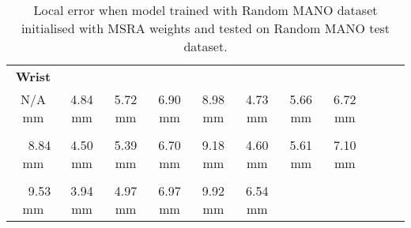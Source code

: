     \begin{table}[!ht]
    \begin{tabular}{|c|c|c|c|c|c|c|c|c|c|c|}
    \hline
    {\bfseries Wrist} & \cellcolor[HTML]{00ff00}{\bfseries IMCP} & \cellcolor[HTML]{00ff00}{\bfseries IPIP} & \cellcolor[HTML]{00ff00}{\bfseries IDIP} & \cellcolor[HTML]{00ff00}{\bfseries ITIP} & \cellcolor[HTML]{00ff00}{\bfseries MMCP} & \cellcolor[HTML]{00ff00}{\bfseries MPIP} & \cellcolor[HTML]{00ff00}{\bfseries MDIP}  \\
    N/A mm & \cellcolor[HTML]{00ff00}$\,\,\,\,\,\,$4.84 mm & \cellcolor[HTML]{00ff00}$\,\,\,\,\,\,$5.72 mm & \cellcolor[HTML]{00ff00}$\,\,\,\,\,\,$6.90 mm & \cellcolor[HTML]{00ff00}$\,\,\,\,\,\,$8.98 mm & \cellcolor[HTML]{00ff00}$\,\,\,\,\,\,$4.73 mm & \cellcolor[HTML]{00ff00}$\,\,\,\,\,\,$5.66 mm & \cellcolor[HTML]{00ff00}$\,\,\,\,\,\,$6.72 mm\\
    \hline
    \cellcolor[HTML]{00ff00}{\bfseries MTIP} & \cellcolor[HTML]{00ff00}{\bfseries RMCP} & \cellcolor[HTML]{00ff00}{\bfseries RPIP} & \cellcolor[HTML]{00ff00}{\bfseries RDIP} & \cellcolor[HTML]{00ff00}{\bfseries RTIP} & \cellcolor[HTML]{00ff00}{\bfseries PMCP} & \cellcolor[HTML]{00ff00}{\bfseries PPIP} & \cellcolor[HTML]{00ff00}{\bfseries PDIP}  \\
    \cellcolor[HTML]{00ff00}$\,\,\,\,\,\,$8.84 mm & \cellcolor[HTML]{00ff00}$\,\,\,\,\,\,$4.50 mm & \cellcolor[HTML]{00ff00}$\,\,\,\,\,\,$5.39 mm & \cellcolor[HTML]{00ff00}$\,\,\,\,\,\,$6.70 mm & \cellcolor[HTML]{00ff00}$\,\,\,\,\,\,$9.18 mm & \cellcolor[HTML]{00ff00}$\,\,\,\,\,\,$4.60 mm & \cellcolor[HTML]{00ff00}$\,\,\,\,\,\,$5.61 mm & \cellcolor[HTML]{00ff00}$\,\,\,\,\,\,$7.10 mm\\
    \hline
    \cellcolor[HTML]{00ff00}{\bfseries PTIP} & \cellcolor[HTML]{00ff00}{\bfseries TMCP} & \cellcolor[HTML]{00ff00}{\bfseries TPIP} & \cellcolor[HTML]{00ff00}{\bfseries PDIP} & \cellcolor[HTML]{00ff00}{\bfseries TTIP} & \cellcolor[HTML]{00ff00}{\bfseries Average}  \\
    \cellcolor[HTML]{00ff00}$\,\,\,\,\,\,$9.53 mm & \cellcolor[HTML]{00ff00}$\,\,\,\,\,\,$3.94 mm & \cellcolor[HTML]{00ff00}$\,\,\,\,\,\,$4.97 mm & \cellcolor[HTML]{00ff00}$\,\,\,\,\,\,$6.97 mm & \cellcolor[HTML]{00ff00}$\,\,\,\,\,\,$9.92 mm & \cellcolor[HTML]{00ff00}$\,\,\,\,\,\,$6.54 mm \\
    \cline{1-6}
    \end{tabular}
    \caption{Local error when model trained with Random MANO dataset initialised with MSRA weights and tested on Random MANO test dataset.}
    \label{tb:omol}
    \end{table}
